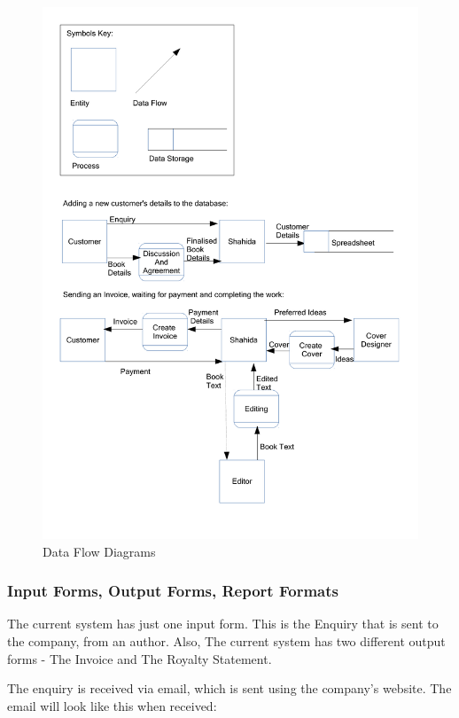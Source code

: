 \begin{figure}[H]
    \includegraphics[width=\textwidth]{./Analysis/Data_Flow_Diagrams_1.pdf}
    \caption{Data Flow Diagrams} \label{Data_Flow_Diagrams_1.pdf}
\end{figure}

\subsubsection{Input Forms, Output Forms, Report Formats}

The current system has just one input form. This is the Enquiry that is sent to the company, from an author. Also, The current system has two different output forms - The Invoice and The Royalty Statement.


The enquiry is received via email, which is sent using the company's website. The email will look like this when received:


